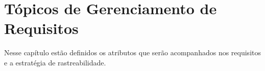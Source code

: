 \chapter[Tópicos de Gerenciamento de Requisitos]{Tópicos de Gerenciamento de Requisitos}

Nesse capítulo estão definidos os atributos que serão acompanhados nos requisitos e a estratégia de rastreabilidade.



